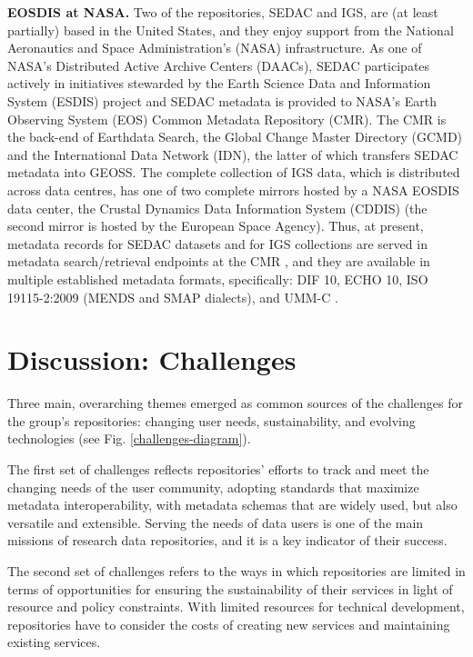 \documentclass{interact}
\begin{document}
\medskip
\noindent \textbf{EOSDIS at NASA.}
Two of the repositories, SEDAC and IGS, are (at least partially) based in the United States, and they enjoy support from the National Aeronautics and Space Administration's (NASA) infrastructure. 
As one of NASA’s Distributed Active Archive Centers (DAACs), SEDAC participates actively in initiatives stewarded by the Earth Science Data and Information System (ESDIS) project and SEDAC metadata is provided to NASA’s Earth Observing System (EOS) Common Metadata Repository (CMR). The CMR is the back-end of Earthdata Search, the Global Change Master Directory (GCMD) and the International Data Network (IDN), the latter of which transfers SEDAC metadata into GEOSS. 
The complete collection of IGS data, which is distributed across data centres, has one of two complete mirrors hosted by a NASA EOSDIS data center, the Crustal Dynamics Data Information System (CDDIS) (the second mirror is hosted by the European Space Agency). Thus, at present, metadata records for SEDAC datasets and for IGS collections are served in metadata search/retrieval endpoints at the CMR \parencite{noll_cddis_2019}, and they are available in multiple established metadata formats, specifically: DIF 10, ECHO 10, ISO 19115-2:2009 (MENDS and SMAP dialects), and UMM-C \parencite{reiter_cmr_2019}.

\section{Discussion: Challenges}\label{discussion}
Three main, overarching themes emerged as common sources of the challenges for the group's repositories: changing user needs, sustainability, and evolving technologies (see Fig. \ref{challenges-diagram}).

The first set of challenges reflects repositories' efforts to track and meet the changing needs of the user community, adopting standards that maximize metadata interoperability, with metadata schemas that are widely used, but also versatile and extensible. Serving the needs of data users is one of the main missions of research data repositories, and it is a key indicator of their success. 

The second set of challenges refers to the ways in which repositories are limited in terms of opportunities for ensuring the sustainability of their services in light of resource and policy constraints. With limited resources for technical development, repositories have to consider the costs of creating new services and maintaining existing services. 
\end{document}
